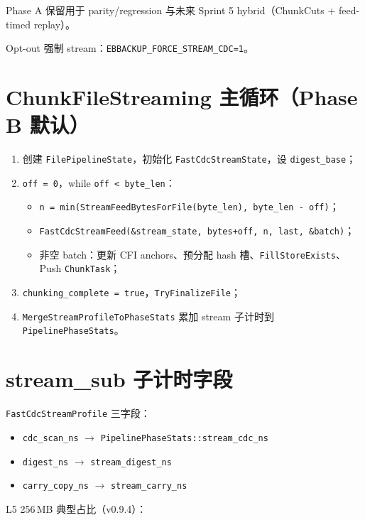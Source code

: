 Phase A 保留用于 parity/regression 与未来 Sprint 5 hybrid（ChunkCuts + feed-timed replay）。

Opt-out 强制 stream：\texttt{EBBACKUP\_FORCE\_STREAM\_CDC=1}。

\section{ChunkFileStreaming 主循环（Phase B 默认）}

\begin{enumerate}
  \item 创建 \texttt{FilePipelineState}，初始化 \texttt{FastCdcStreamState}，设 \texttt{digest\_base}；
  \item \texttt{off = 0}，while \texttt{off < byte\_len}：
  \begin{itemize}[nosep]
    \item \texttt{n = min(StreamFeedBytesForFile(byte\_len), byte\_len - off)}；
    \item \texttt{FastCdcStreamFeed(\&stream\_state, bytes+off, n, last, \&batch)}；
    \item 非空 batch：更新 CFI anchors、预分配 hash 槽、\texttt{FillStoreExists}、Push \texttt{ChunkTask}；
  \end{itemize}
  \item \texttt{chunking\_complete = true}，\texttt{TryFinalizeFile}；
  \item \texttt{MergeStreamProfileToPhaseStats} 累加 stream 子计时到 \texttt{PipelinePhaseStats}。
\end{enumerate}

\section{stream\_sub 子计时字段}

\texttt{FastCdcStreamProfile} 三字段：
\begin{itemize}[nosep]
  \item \texttt{cdc\_scan\_ns} $\rightarrow$ \texttt{PipelinePhaseStats::stream\_cdc\_ns}
  \item \texttt{digest\_ns} $\rightarrow$ \texttt{stream\_digest\_ns}
  \item \texttt{carry\_copy\_ns} $\rightarrow$ \texttt{stream\_carry\_ns}
\end{itemize}

L5 256\,MB 典型占比（v0.9.4）：

